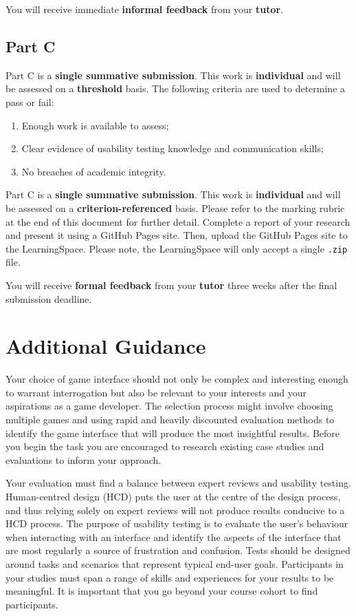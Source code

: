 \documentclass{../../fal_assignment}
\begin{document}
You will receive immediate \textbf{informal feedback} from your \textbf{tutor}.

\subsection*{Part C}

Part C is a \textbf{single summative submission}. This work is \textbf{individual} and will be assessed on a \textbf{threshold} basis. The following criteria are used to determine a pass or fail: 

\begin{enumerate}[label=(\alph*)]
	\item Enough work is available to assess; 
	\item Clear evidence of usability testing knowledge and communication skills; 
	\item No breaches of academic integrity. 
\end{enumerate}

Part C is a \textbf{single summative submission}. This work is \textbf{individual} and will be assessed on a \textbf{criterion-referenced} basis. Please refer to the marking rubric at the end of this document for further detail. Complete a report of your research and present it using a GitHub Pages site. Then, upload the GitHub Pages site to the LearningSpace. Please note, the LearningSpace will only accept a single \texttt{.zip} file. 

You will receive \textbf{formal feedback} from your \textbf{tutor} three weeks after the final submission deadline.

\section*{Additional Guidance}

Your choice of game interface should not only be complex and interesting enough to warrant interrogation but also be relevant to your interests and your aspirations as a game developer. The selection process might involve choosing multiple games and using rapid and heavily discounted evaluation methods to identify the game interface that will produce the most insightful results. Before you begin the task you are encouraged to research existing case studies and evaluations to inform your approach. 

Your evaluation must find a balance between expert reviews and usability testing. Human-centred design (HCD) puts the user at the centre of the design process, and thus relying solely on expert reviews will not produce results conducive to a HCD process. The purpose of usability testing is to evaluate the user's behaviour when interacting with an interface and identify the aspects of the interface that are most regularly a source of frustration and confusion. Tests should be designed around tasks and scenarios that represent typical end-user goals. Participants in your studies must span a range of skills and experiences for your results to be meaningful. It is important that you go beyond your course cohort to find participants. 
\end{document}
